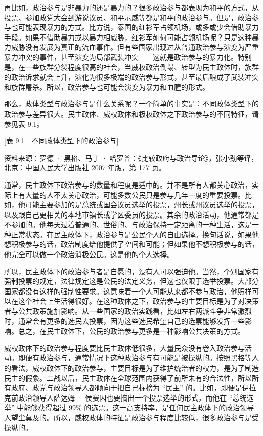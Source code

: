 再比如，政治参与是非暴力的还是暴力的？很多政治参与都表现为和平的方式，从投票、参加政党大会到游说议员、和平示威等都是和平的政治参与。但是，政治参与也可能表现暴力的方式。比方说，泰国的红衫军占领机场，或多或少会借助暴力手段。如果不借助暴力或以暴力相威胁，红衫军如何可能占领机场呢？只是这种暴力威胁没有发展为真正的流血事件。但有些国家出现过从普通政治参与演变为严重暴力冲突的事件，甚至演变为局部武装冲突——这就是政治参与的暴力化。特别是，在一些族群分裂程度很高的社会，当威权政治倒塌、转型为民主政体时，族群的政治诉求就会上升，演化为很多极端的政治参与形式，甚至最后酿成了武装冲突和族群屠杀。所以，政治参与也可能会演变为暴力和血腥的形式。


那么，政体类型与政治参与是什么关系呢？一个简单的事实是：不同政体类型下的政治参与差异很大。民主政体、威权政体和极权政体之下政治参与的不同特征，请参见表 9.1。

[表 9.1　不同政体类型下的政治参与]

资料来源：罗德 · 黑格、马丁 · 哈罗普：《比较政府与政治导论》，张小劲等译，北京：中国人民大学出版社 2007 年版，第 177 页。

通常，民主政体下政治参与的数量和程度是适中的。并不是所有人都关心政治，实际上有大量的人不太关心政治，可能多数公民只是参与几年一度的重要投票。比如，他可能主要参加的是总统或国会议员选举的投票，州长或州议员选举的投票，以及跟自己更相关的本地市镇长或学区委员的投票。其余的政治活动，他通常都是不参加的。他每天过着普通的、世俗的、与政治保持一定距离的一种生活，这是一种正常状态。在民主政体下，政治参与是公民个人的自由选择。换句话说，如果他想积极参与的话，政治制度给他提供了空间和可能；但如果他不想积极参与的话，他完全可以做一个政治消极公民。这是他的个人选择。

所以，民主政体下的政治参与者是自愿的，没有人可以强迫他。当然，个别国家有强制投票的规定，法律规定这是公民的法定义务，但这也仅限于选举投票。大部分国家都没有这样的强制性要求。这意味着一个人可能从来都不参与政治，他照样可以在这个社会上生活得很好。在这种政体之下，政治参与的主要目标是为了对决策者与公共政策施加影响。从一些国家的政治实践看，比如左右两派斗争非常激烈时，通常会有更多的选民去投票，因为这些选民希望自己的选票能够发挥一些影响。总之，在民主政体下，公民的政治参与更多是一种影响公共决策的方式。

威权政体下的政治参与程度要比民主政体低很多，大量民众没有卷入政治参与活动。即便有政治参与，通常情况下这种政治参与有可能是被操纵的。按照黑格等人的看法，威权政体下的政治参与，主要目标是为了维护统治者的权力，是为了制造民主的假象。二战以后，民主政体在全球范围内获得了前所未有的合法性，所以所有政府、政党与政治领导人都倾向于把自己标榜为 “民主” 的。比如，即便是伊拉克前政治领导人萨达姆 · 侯赛因也要搞出一个投票选举的形式，而他在 “总统选举” 中能够获得超过 99\% 的选票。这一高支持率，是任何民主政体下的政治领导人望尘莫及的。所以，威权政体的特征是政治参与程度比较低，很多政治参与是受操纵的。

